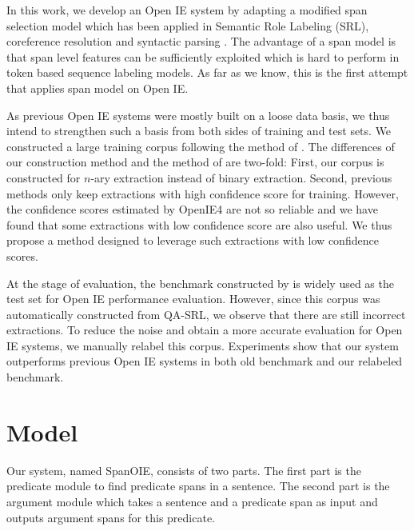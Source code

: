 \documentclass[letterpaper]{article} %
\begin{document}
In this work, we develop an Open IE system by adapting a modified span selection model which has been applied in Semantic Role Labeling (SRL)\cite{Ouchi2018ASS,he-etal-2018-syntax,Li2019DependencyOS,Zhao2013IntegrativeSD,zhao-etal-2009-semantic,li-etal-2018-unified,cai2018full}, coreference resolution\cite{shou-zhao-2012-system,zhang-etal-2012-chinese} and syntactic parsing \cite{zhang-etal-2016-probabilistic,ma-zhao-2012-fourth,Li2020GlobalGreedy,zhou-zhao-2019-head,zhao-etal-2009-cross,li-etal-2018-seq2seq}. The advantage of a span model is that span level features can be sufficiently exploited which is hard to perform in token based sequence labeling models. As far as we know, this is the first attempt that applies span model on Open IE.

As previous Open IE systems were mostly built on a loose data basis, we thus intend to strengthen such a basis from both sides of training and test sets. We constructed a large training corpus following the method of \cite{Cui2018NeuralOI}. The differences of our construction method and the method of \cite{Cui2018NeuralOI} are two-fold: First, our corpus is constructed for $n$-ary extraction instead of binary extraction. Second, previous methods only keep extractions with high confidence score for training. However, the confidence scores estimated by OpenIE4 are not so reliable and we have found that some extractions with low confidence score are also useful. We thus propose a method designed to leverage such extractions with low confidence scores.

At the stage of evaluation, the benchmark constructed by \cite{Stanovsky2016CreatingAL} is widely used as the test set for Open IE performance evaluation. However, since this corpus was automatically constructed from QA-SRL, we observe that there are still incorrect extractions. To reduce the noise and obtain a more accurate evaluation for Open IE systems, we manually relabel this corpus. Experiments show that our system outperforms previous Open IE systems in both old benchmark and our relabeled benchmark.

\section{Model}
Our system, named SpanOIE, consists of two parts. The first part is the predicate module to find predicate spans in a sentence. The second part is the argument module which takes a sentence and a predicate span as input and outputs argument spans for this predicate.
\end{document}
